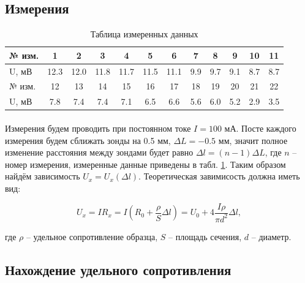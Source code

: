 \documentclass[a4paper,12pt]{article} %
\begin{document}
\subsection{Измерения}

\begin{table}[h]
\centering
\begin{tabular}{|l|c|c|c|c|c|c|c|c|c|c|c|}
\hline
№ изм. & 1    & 2    & 3    & 4    & 5    & 6    & 7   & 8   & 9   & 10  & 11  \\ \hline
U, мВ  & 12.3 & 12.0 & 11.8 & 11.7 & 11.5 & 11.1 & 9.9 & 9.7 & 9.1 & 8.7 & 8.7 \\ \hline
№ изм. & 12   & 13   & 14   & 15   & 16   & 17   & 18  & 19  & 20  & 21  & 22  \\ \hline
U, мВ  & 7.8  & 7.4  & 7.4  & 7.1  & 6.5  & 6.6  & 5.6 & 6.0 & 5.2 & 2.9 & 3.5 \\ \hline
\end{tabular}
\caption{Таблица измеренных данных}
\label{tab:data}
\end{table}

\paragraph{} Измерения будем проводить при постоянном токе $I = 100$ мА. Посте каждого измерения будем сближать зонды на 0.5 мм, $\Delta L = -0.5$ мм, значит полное изменение расстояния между зондами будет равно $\Delta l = (n - 1) \Delta L$, где $n$ -- номер измерения, измеренные данные приведены в табл. \ref{tab:data}. Таким образом найдём зависимость $U_x = U_x(\Delta l)$. Теоретическая завимисость должна иметь вид:

\begin{equation}
U_x = I R_x = I \left( R_0 + \frac{\rho}{S} \Delta l \right) = U_0 + 4 \frac{I \rho}{\pi d^2} \Delta l,
\label{e:ux}
\end{equation}

\noindent где $\rho$ -- удельное сопротивление образца, $S$ -- площадь сечения, $d$ -- диаметр.

\subsection{Нахождение удельного сопротивления}
\end{document}
